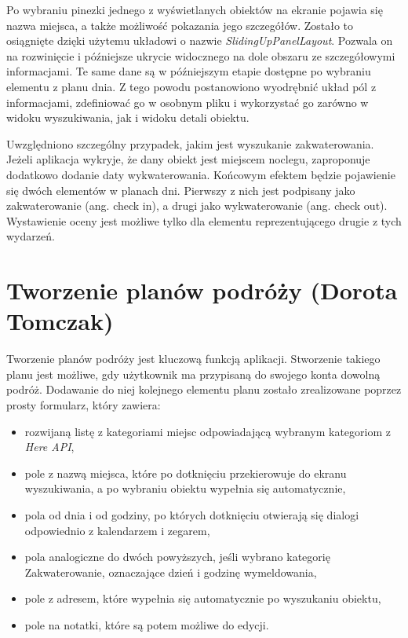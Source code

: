 \documentclass[10pt,twoside,a4paper]{report}
\begin{document}
\par Po wybraniu pinezki jednego z wyświetlanych obiektów na ekranie pojawia się nazwa miejsca, a także możliwość pokazania jego szczegółów. Zostało to osiągnięte dzięki użytemu układowi o nazwie \textit{SlidingUpPanelLayout}\cite{SlidingUpPanelLayout}. Pozwala on na rozwinięcie i późniejsze ukrycie widocznego na dole obszaru ze szczegółowymi informacjami. Te same dane są w późniejszym etapie dostępne po wybraniu elementu z planu dnia. Z tego powodu postanowiono wyodrębnić układ pól z informacjami, zdefiniować go w osobnym pliku i wykorzystać go zarówno w widoku wyszukiwania, jak i widoku detali obiektu.

\par Uwzględniono szczególny przypadek, jakim jest wyszukanie zakwaterowania. Jeżeli aplikacja wykryje, że dany obiekt jest miejscem noclegu, zaproponuje dodatkowo dodanie daty wykwaterowania. Końcowym efektem będzie pojawienie się dwóch elementów w planach dni. Pierwszy z nich jest podpisany jako zakwaterowanie (ang. check in), a drugi jako wykwaterowanie (ang. check out). Wystawienie oceny jest możliwe tylko dla elementu reprezentującego drugie z tych wydarzeń.


\section{Tworzenie planów podróży (Dorota Tomczak)}
\par Tworzenie planów podróży jest kluczową funkcją aplikacji. Stworzenie takiego planu jest możliwe, gdy użytkownik ma przypisaną do swojego konta dowolną podróż. Dodawanie do niej kolejnego elementu planu zostało zrealizowane poprzez prosty formularz, który zawiera:
\begin{itemize}
\item rozwijaną listę z kategoriami miejsc odpowiadającą wybranym kategoriom z \textit{Here API}\cite{Here},
\item pole z nazwą miejsca, które po dotknięciu przekierowuje do ekranu wyszukiwania, a po wybraniu obiektu wypełnia się automatycznie,
\item pola od dnia i od godziny, po których dotknięciu otwierają się dialogi odpowiednio z kalendarzem i zegarem,
\item pola analogiczne do dwóch powyższych, jeśli wybrano kategorię Zakwaterowanie, oznaczające dzień i godzinę wymeldowania,
\item pole z adresem, które wypełnia się automatycznie po wyszukaniu obiektu,
\item pole na notatki, które są potem możliwe do edycji.
\end{itemize}
\end{document}

